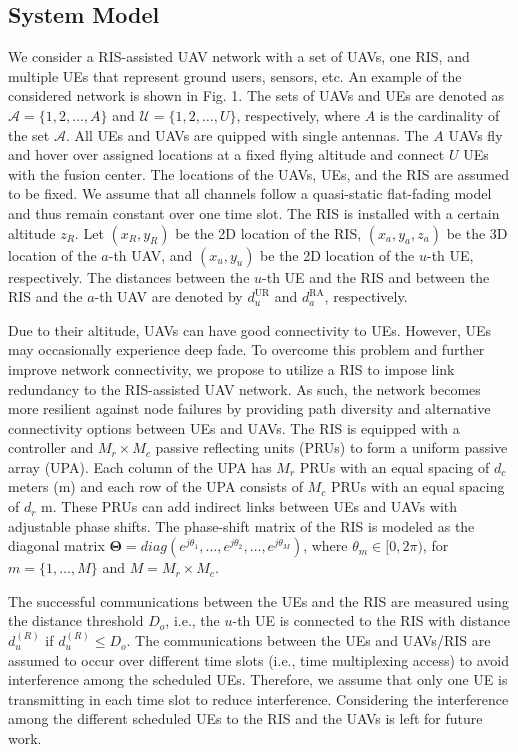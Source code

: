 \documentclass[conference]{IEEEtran}
\begin{document}
\subsection{System Model}\label{SA}
We consider a RIS-assisted UAV network with a set of UAVs, one RIS, and multiple UEs that represent ground users, sensors, etc. An example of the considered network is shown in Fig. 1. The sets of UAVs and UEs are denoted as $\mathcal A=\{1, 2, \ldots, A\}$  and $\mathcal U=\{1, 2, \ldots, U\}$, respectively, where $A$ is the cardinality of the set $\mathcal A$. All UEs and UAVs are quipped with single antennas. 
The $A$ UAVs fly and hover over
assigned locations at a fixed flying altitude and connect $U$ UEs with the fusion center. The locations of the UAVs, UEs, and the RIS are assumed to be fixed. We assume that all channels follow a quasi-static flat-fading model and thus remain constant over one time slot. The RIS is installed with a certain altitude $z_R$. Let $(x_R, y_R)$ be the 2D location of the RIS, $(x_a, y_a, z_a)$ be the 3D location of the $a$-th UAV, 
and $(x_u, y_u)$ be the 2D location of the $u$-th UE, respectively. The distances between the $u$-th UE and the RIS and between the RIS and the $a$-th UAV are denoted by $d^\text{UR}_{u}$ and $d^\text{RA}_{a}$, respectively.




Due to their altitude, UAVs can have good  connectivity to UEs. However, UEs may occasionally experience deep fade. To overcome this problem and further improve network connectivity, we propose to utilize a RIS to impose link redundancy to the RIS-assisted UAV network. As such, the network becomes more resilient against node failures by providing path diversity and alternative connectivity options between UEs and UAVs. The RIS is equipped with a controller and $M_r \times M_c$ passive reflecting units (PRUs) to form a uniform passive array (UPA). Each column of the UPA has $M_r$ PRUs with an equal spacing of $d_c$ meters (m) and each row of the UPA consists of $M_c$ PRUs with an equal spacing of $d_r$ m. These PRUs can add indirect links between UEs and UAVs with adjustable phase shifts. The phase-shift matrix of the RIS is modeled as the diagonal matrix $\mathbf{\Theta} =diag(e^{j\theta_{1}},\ldots, e^{j\theta_{2}},\ldots,e^{j\theta_{M}})$, where $\theta_{m}\in [0,2\pi)$, for $m=\{1, \ldots, M\}$ and $M = M_r \times M_c$.



The successful communications between the UEs and the RIS are measured using the distance threshold $D_o$, i.e., the $u$-th UE is connected to the RIS with distance $d^{(R)}_{u}$ if $d^{(R)}_{u} \leq D_o$.
The communications between the UEs and UAVs/RIS are assumed to occur over different time slots (i.e., time multiplexing access) to avoid interference among the scheduled UEs. Therefore, we assume that only one UE is transmitting in each time slot to reduce interference. Considering the interference among the different scheduled UEs to the RIS and the UAVs is left for future work. 
\end{document}
